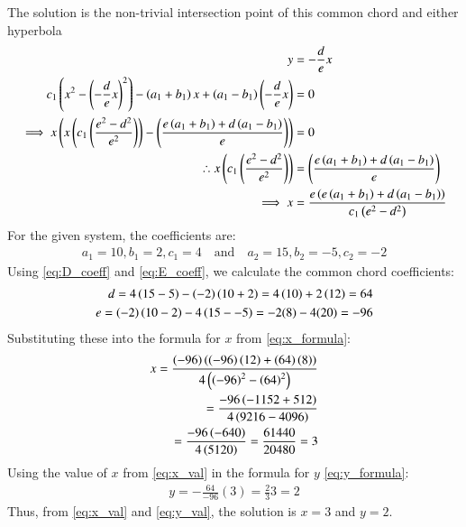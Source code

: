 \documentclass[journal]{IEEEtran}
\begin{document}
	The solution is the non-trivial intersection point of this common chord and either hyperbola
	\begin{align}
		y &= -\frac{d}{e}x \label{eq:y_formula} \\
		c_1\left(x^2 - \left(-\frac{d}{e}x\right)^2\right) - \left(a_1+b_1\right)x + \left(a_1-b_1\right)\left(-\frac{d}{e}x\right) &= 0 \\
		\implies x \left( x\left(c_1\left(\frac{e^2-d^2}{e^2}\right)\right) - \left(\frac{e\left(a_1+b_1\right) + d\left(a_1-b_1\right)}{e}\right) \right) &= 0 \\
		\therefore x\left(c_1\left(\frac{e^2-d^2}{e^2}\right)\right) &= \left(\frac{e\left(a_1+b_1\right)+d\left(a_1-b_1\right)}{e}\right) \\
		\implies x &= \frac{e\left(e\left(a_1+b_1\right)+d\left(a_1-b_1\right)\right)}{c_1\left(e^2-d^2\right)} \label{eq:x_formula}
	\end{align}
	For the given system, the coefficients are:
	\begin{align}
		a_1 = 10, b_1 = 2, c_1 = 4 \quad \text{and} \quad a_2 = 15, b_2 = -5, c_2 = -2
	\end{align}
	Using \eqref{eq:D_coeff} and \eqref{eq:E_coeff}, we calculate the common chord coefficients:
	\begin{align}
		d = 4\left(15-5\right) - \left(-2\right)\left(10+2\right) = 4\left(10\right) + 2\left(12\right) = 64 \\
		e = \left(-2\right)\left(10-2\right) - 4\left(15--5\right) = -2(8) - 4(20) = -96
	\end{align}
	Substituting these into the formula for $x$ from \eqref{eq:x_formula}:
	\begin{align}
		x = \frac{\left(-96\right) \left(\left(-96\right)\left(12\right) + \left(64\right)\left(8\right)\right)}{4\left(\left(-96\right)^2-\left(64\right)^2\right)} \\
		= \frac{-96  \left(-1152 + 512\right)}{4\left(9216 - 4096\right)} \\
		= \frac{-96\left(-640\right)}{4\left(5120\right)} = \frac{61440}{20480} = 3 \label{eq:x_val}
	\end{align}
	Using the value of $x$ from \eqref{eq:x_val} in the formula for $y$ \eqref{eq:y_formula}:
	\begin{align}
		y = -\frac{64}{-96}(3) = \frac{2}{3}3 = 2 \label{eq:y_val}
	\end{align}
	Thus, from \eqref{eq:x_val} and \eqref{eq:y_val}, the solution is $x=3$ and $y=2$.
	
\end{document}
